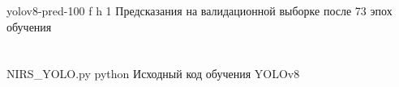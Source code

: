 \begin{appendices}
{yolov8-pred-100} %
{f} %
{h} %
{1\textwidth} %
{Предсказания на валидационной выборке после 73 эпох обучения} %
\chapter{}

{NIRS_YOLO.py} %
{python} %
{Исходный код обучения YOLOv8} %

	

\end{appendices}